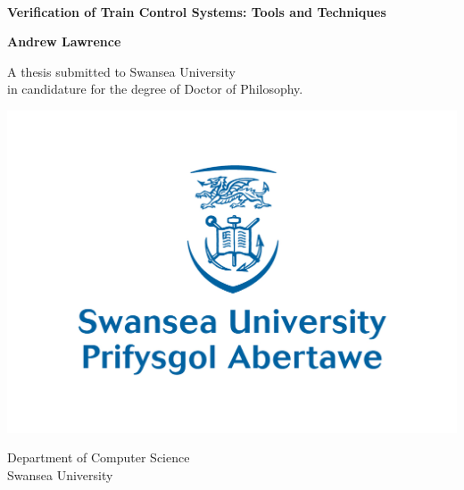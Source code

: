 \documentclass[11pt, a4paper, twoside, openright]{book}
\newcommand{\thesisdate}{\formatdate{1}{6}{2015}}
\begin{document}
${ \ } $ \vspace{4cm}
%
%


\begin{center}
{\huge \bf Verification of Train Control Systems: Tools and Techniques}
\end{center}

\begin{center}
{\large \bf Andrew Lawrence}
\end{center}

\begin{center}
\thesisdate
\end{center}

\vspace{2.5cm}



\vfill

\begin{center}
A thesis submitted to Swansea University\\
in candidature for the degree of Doctor of Philosophy.
\end{center}

\begin{center}
\includegraphics[scale=0.4]{logo} 
\end{center}

\begin{center}
Department of Computer Science\\
Swansea University
\end{center}
\end{document}
